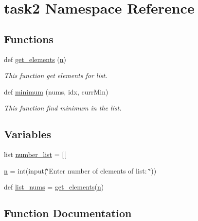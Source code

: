 \hypertarget{namespacetask2}{}\section{task2 Namespace Reference}
\label{namespacetask2}
\subsection*{Functions}
\begin{DoxyCompactItemize}
\item 
def \hyperlink{namespacetask2_a432a279dd14fb6454f57f0bbe95a1360}{get\+\_\+elements} (\hyperlink{namespacetask2_a639bf5c5a83c25a0c5f798a271b6d57a}{n})
\begin{DoxyCompactList}\small\item\em This function get elements for list. \end{DoxyCompactList}\item 
def \hyperlink{namespacetask2_aaa79f6bc3a09c7d3bb38c288f2167ee1}{minimum} (nums, idx, curr\+Min)
\begin{DoxyCompactList}\small\item\em This function find minimum in the list. \end{DoxyCompactList}\end{DoxyCompactItemize}
\subsection*{Variables}
\begin{DoxyCompactItemize}
\item 
list \hyperlink{namespacetask2_aa8667dc535028ca44d37a774a5be3c8a}{number\+\_\+list} = \mbox{[}$\,$\mbox{]}
\item 
\hyperlink{namespacetask2_a639bf5c5a83c25a0c5f798a271b6d57a}{n} = int(input(\char`\"{}Enter number of elements of list\+: \char`\"{}))
\item 
def \hyperlink{namespacetask2_ab347180da4f986287b292509879abce8}{list\+\_\+nums} = \hyperlink{namespacetask2_a432a279dd14fb6454f57f0bbe95a1360}{get\+\_\+elements}(\hyperlink{namespacetask2_a639bf5c5a83c25a0c5f798a271b6d57a}{n})
\end{DoxyCompactItemize}


\subsection{Function Documentation}
\mbox{\label{namespacetask2_a432a279dd14fb6454f57f0bbe95a1360}} 
